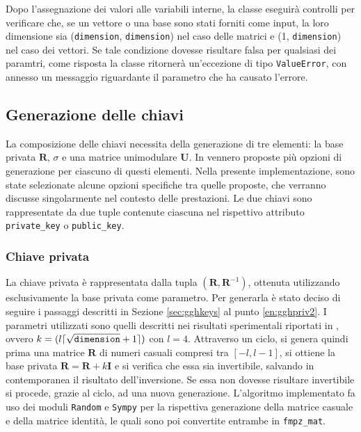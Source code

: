 Dopo l'assegnazione dei valori alle variabili interne, la classe eseguirà controlli 
per verificare che, se un vettore o una base sono stati forniti come input, la loro 
dimensione sia (\texttt{dimension}, \texttt{dimension})
nel caso delle matrici e (1, \texttt{dimension}) nel caso dei vettori. Se tale condizione
dovesse risultare falsa per qualsiasi dei paramtri, come risposta la classe ritornerà
un'eccezione di tipo \texttt{ValueError}, con annesso un messaggio riguardante il parametro
che ha causato l'errore.

\subsection{Generazione delle chiavi}

La composizione delle chiavi necessita della generazione di tre elementi: 
la base privata $\mathbf{R}$, $\sigma$ e una matrice unimodulare $\mathbf{U}$. 
In \cite{GGH97} vennero proposte più opzioni di generazione
per ciascuno di questi elementi. Nella presente implementazione, sono state selezionate 
alcune opzioni specifiche tra quelle proposte, che verranno discusse singolarmente nel contesto
delle prestazioni. Le due chiavi sono rappresentate da due tuple contenute ciascuna
nel rispettivo attributo \texttt{private\_key} o \texttt{public\_key}.

\subsubsection{Chiave privata}
\label{sec:gghimplementationprivkey}
La chiave privata è rappresentata dalla tupla $(\mathbf{R}, \mathbf{R}^{-1})$,
ottenuta utilizzando esclusivamente la base privata come parametro.
Per generarla è stato deciso di seguire i passaggi descritti 
in Sezione \ref{sec:gghkeys} al punto \ref{en:gghpriv2}. I parametri utilizzati sono
quelli descritti nei risultati sperimentali riportati in \cite{GGH97}, ovvero 
$k = (l \lceil \sqrt{\text{\texttt{dimension}}} + 1 \rceil)$ con $l = 4$. 
Attraverso un ciclo, si genera quindi prima una matrice $\mathbf{R}$ di numeri casuali 
compresi tra $[-l, l-1]$, si ottiene la base privata $\mathbf{R} = \mathbf{R}+k\mathbf{I}$ 
e si verifica che essa sia invertibile, salvando in contemporanea il risultato dell'inversione.
Se essa non dovesse risultare invertibile si procede, grazie al ciclo, ad una nuova generazione. 
L'algoritmo implementato fa uso dei moduli \texttt{Random} e \texttt{Sympy} per la rispettiva
generazione della matrice casuale e della matrice identità, le quali sono poi convertite
entrambe in \texttt{fmpz\_mat}. 

